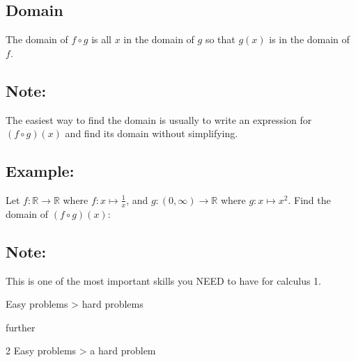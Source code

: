 \documentclass[20pt]{extarticle}
\newcommand{\LP}{\left(}
\newcommand{\RP}{\right)}
\newcommand{\R}{\mathbb{R}}
\begin{document}
\subsection*{\textbf{\color{draculaorange}Domain}}
The domain of $f\circ g$ is all $x$ in the domain of $g$ so that $g(x)$ is in the domain of $f$.
\vskip8cm


\subsection*{\textbf{\color{draculacyan}Note:}}
The easiest way to find the domain is usually to write an expression for $(f\circ g)(x)$ and find its domain without simplifying.




\newpage

\subsection*{\textbf{\color{draculared}Example:}}
Let \(f:\R\to\R\) where \(f:x\mapsto \frac{1}{x}\), and
\(g:\LP 0,\infty\RP\to \R\) where \(g:x\mapsto x^2\).
\vskip4cm
Find the domain of \(\LP f\circ g\RP(x)\):


\newpage

\subsection*{\textbf{\color{draculacyan}Note:}}
This is one of the most important skills you NEED to have for calculus 1.

\begin{center}
  Easy problems > hard problems
\end{center}
\vskip8cm
further
\begin{center}
  2 Easy problems > a hard problem
\end{center}
\end{document}
